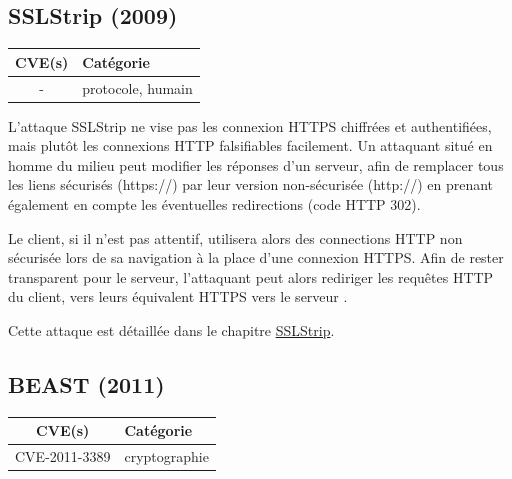 

\subsection{SSLStrip (2009)}

\begin{tabularx}{0.96\textwidth}{|c|X|}
  \hline
  \textbf{CVE(s)} & \textbf{Catégorie} \\
  \hline
  - & protocole, humain \\
  \hline
\end{tabularx}

\vspace{1em}

L'attaque SSLStrip ne vise pas les connexion HTTPS chiffrées et authentifiées, mais plutôt les connexions HTTP falsifiables facilement. Un attaquant situé en homme du milieu peut modifier les réponses d'un serveur, afin de remplacer tous les liens sécurisés (https://) par leur version non-sécurisée (http://) en prenant également en compte les éventuelles redirections (code HTTP 302).

Le client, si il n'est pas attentif, utilisera alors des connections HTTP non sécurisée lors de sa navigation à la place d'une connexion HTTPS. Afin de rester transparent pour le serveur, l'attaquant peut alors rediriger les requêtes HTTP du client, vers leurs équivalent HTTPS vers le serveur \cite{sslstrip-website}.

Cette attaque est détaillée dans le chapitre \hyperref[sec:sslstrip]{SSLStrip}.



\subsection{BEAST (2011)}

\begin{tabularx}{0.96\textwidth}{|c|X|}
  \hline
  \textbf{CVE(s)} & \textbf{Catégorie} \\
  \hline
  CVE-2011-3389 & cryptographie \\
  \hline
\end{tabularx}

\vspace{1em}

